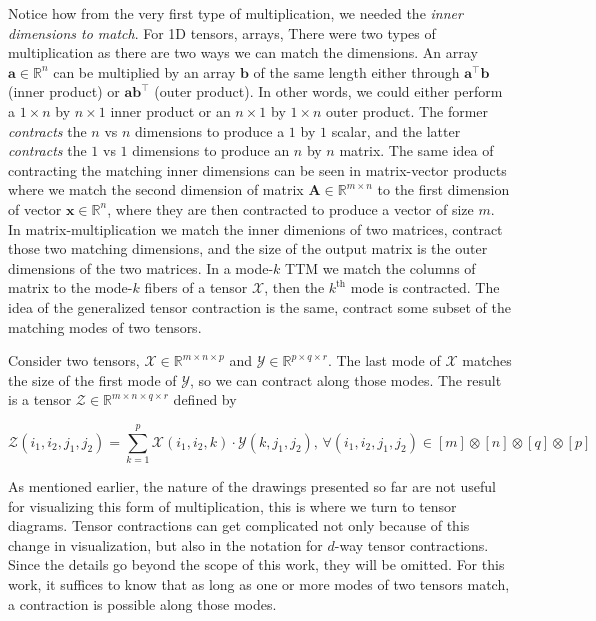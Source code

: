         Notice how from the very first type of multiplication, we needed the
        \textit{inner dimensions to match}. For 1D tensors, arrays, There were
        two types of multiplication as there are two ways we can match the
        dimensions. An array $\mathbf{a} \in \mathbb{R}^{n}$ can be multiplied
        by an array $\mathbf{b}$ of the same length either through
        $\mathbf{a}^\intercal \mathbf{b}$ (inner product) or
        $\textbf{ab}^\intercal$ (outer product). In other words, we could either
        perform a $1 \times n$ by $n\times 1$ inner product or an $n\times 1$ by
        $1\times n$ outer product. The former \textit{contracts} the $n$ vs $n$
        dimensions to produce a $1$ by $1$ scalar, and the latter
        \textit{contracts} the $1$ vs $1$ dimensions to produce an $n$ by $n$
        matrix. The same idea of contracting the matching inner dimensions can
        be seen in matrix-vector products where we match the second dimension of
        matrix $\mathbf{A}\in \mathbb{R}^{m\times n}$ to the first dimension of
        vector $\mathbf{x}\in \mathbb{R}^n$, where they are then contracted to
        produce a vector of size $m$. In matrix-multiplication we match the
        inner dimenions of two matrices, contract those two matching dimensions,
        and the size of the output matrix is the outer dimensions of the two
        matrices. In a mode-$k$ TTM we match the columns of matrix to the
        mode-$k$ fibers of a tensor $\mathcal{X}$, then the $k^\text{th}$ mode
        is contracted. The idea of the generalized tensor contraction is the
        same, contract some subset of the  matching modes of two tensors. 

        Consider two tensors, $\mathcal{X}\in\mathbb{R}^{m\times n\times p}$ and
        $\mathcal{Y}\in\mathbb{R}^{p\times q\times r}$. The last mode of
        $\mathcal{X}$ matches the size of the first mode of $\mathcal{Y}$, so we
        can contract along those modes. The result is a tensor
        $\mathcal{Z}\in\mathbb{R}^{m\times n\times q\times r}$ defined by 

        \begin{equation*}
            \mathcal{Z}(i_1, i_2, j_1, j_2) = \sum_{k=1}^{p} \mathcal{X}(i_1, i_2, k)\cdot \mathcal{Y}(k, j_1, j_2)\text{, }\forall (i_1, i_2, j_1, j_2) \in [m]\otimes[n]\otimes[q]\otimes[p]
        \end{equation*}

        As mentioned earlier, the nature of the drawings presented so far are
        not useful for visualizing this form of multiplication, this is where we
        turn to tensor diagrams. Tensor contractions can get complicated not
        only because of this change in visualization, but also in the notation
        for $d$-way tensor contractions. Since the details go beyond the scope
        of this work, they will be omitted. For this work, it suffices to know
        that as long as one or more modes of two tensors match, a contraction is
        possible along those modes. 